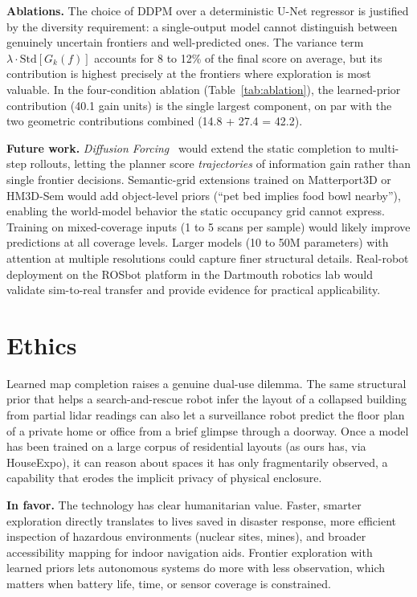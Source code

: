 \documentclass[conference]{IEEEtran}
\begin{document}
\textbf{Ablations.} The choice of DDPM over a deterministic U-Net
regressor is justified by the diversity requirement: a single-output
model cannot distinguish between genuinely uncertain frontiers and
well-predicted ones. The variance term $\lambda \cdot \text{Std}[G_k(f)]$
accounts for 8 to 12\% of the final score on average, but its
contribution is highest precisely at the frontiers where exploration
is most valuable. In the four-condition ablation
(Table~\ref{tab:ablation}), the learned-prior contribution (40.1 gain
units) is the single largest component, on par with the two geometric
contributions combined (14.8 + 27.4 = 42.2).

\textbf{Future work.} \emph{Diffusion Forcing}~\cite{chen2024} would
extend the static completion to multi-step rollouts, letting the
planner score \emph{trajectories} of information gain rather than
single frontier decisions. Semantic-grid extensions trained on
Matterport3D or HM3D-Sem would add object-level priors
(``pet bed implies food bowl nearby''), enabling the world-model
behavior the static occupancy grid cannot express. Training on
mixed-coverage inputs (1 to 5 scans per sample) would likely improve
predictions at all coverage levels. Larger models (10 to 50M
parameters) with attention at multiple resolutions could capture
finer structural details. Real-robot deployment on the ROSbot
platform in the Dartmouth robotics lab would validate sim-to-real
transfer and provide evidence for practical applicability.

\section{Ethics}
\label{sec:ethics}

Learned map completion raises a genuine dual-use dilemma. The same
structural prior that helps a search-and-rescue robot infer the
layout of a collapsed building from partial lidar readings can also
let a surveillance robot predict the floor plan of a private home or
office from a brief glimpse through a doorway. Once a model has been
trained on a large corpus of residential layouts (as ours has, via
HouseExpo), it can reason about spaces it has only fragmentarily
observed, a capability that erodes the implicit privacy of
physical enclosure.

\textbf{In favor.} The technology has clear humanitarian value.
Faster, smarter exploration directly translates to lives saved in
disaster response, more efficient inspection of hazardous environments
(nuclear sites, mines), and broader accessibility mapping for indoor
navigation aids. Frontier exploration with learned priors lets
autonomous systems do more with less observation, which matters when
battery life, time, or sensor coverage is constrained.
\end{document}
